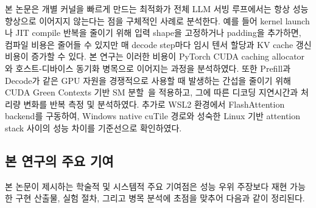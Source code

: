 \documentclass{kcc}            %
\begin{document}
본 논문은 개별 커널을 빠르게 만드는 최적화가 전체 LLM 서빙 루프에서는
항상 성능 향상으로 이어지지 않는다는 점을 구체적인 사례로 분석한다.
예를 들어 kernel launch나 JIT compile 반복을 줄이기 위해 입력 shape을
고정하거나 padding을 추가하면, 컴파일 비용은 줄어들 수 있지만 매 decode
step마다 임시 텐서 할당과 KV cache 갱신 비용이 증가할 수 있다. 본 연구는
이러한 비용이 PyTorch CUDA caching allocator와 호스트-디바이스 동기화
병목으로 이어지는 과정을 분석하였다. 또한 Prefill과 Decode가 같은 GPU
자원을 경쟁적으로 사용할 때 발생하는 간섭을 줄이기 위해 CUDA Green
Contexts 기반 SM 분할~\cite{greencontexts}을 적용하고, 그에 따른 디코딩 지연시간과 처리량
변화를 반복 측정 및 분석하였다. 추가로 WSL2 환경에서 FlashAttention
backend를 구동하여, Windows native cuTile 경로와 성숙한 Linux 기반
attention stack 사이의 성능 차이를 기준선으로 확인하였다.

\subsection{본 연구의 주요 기여}
본 논문이 제시하는 학술적 및 시스템적 주요 기여점은 성능 우위 주장보다
재현 가능한 구현 산출물, 실험 절차, 그리고 병목 분석에 초점을 맞추어
다음과 같이 정리된다.
\end{document}
